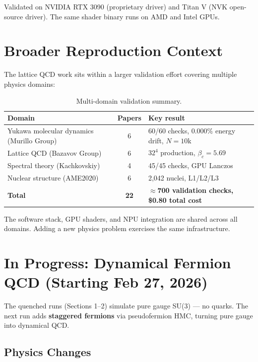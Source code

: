 \documentclass[11pt,a4paper]{article}
\newcommand{\btc}{\beta_c}
\begin{document}
Validated on NVIDIA RTX 3090 (proprietary driver) and Titan V (NVK open-source
driver).  The same shader binary runs on AMD and Intel GPUs.

\FloatBarrier
\section{Broader Reproduction Context}

The lattice QCD work sits within a larger validation effort covering multiple
physics domains:

\begin{table}[H]
\centering
\caption{Multi-domain validation summary.}
\label{tab:domains}
\renewcommand{\arraystretch}{1.25}
\begin{tabular}{lcl}
\toprule
Domain & Papers & Key result \\
\midrule
Yukawa molecular dynamics (Murillo Group) & 6 & 60/60 checks, 0.000\% energy drift, $N{=}10$k \\
Lattice QCD (Bazavov Group)               & 6 & $32^4$ production, $\btc = 5.69$ \\
Spectral theory (Kachkovskiy)             & 4 & 45/45 checks, GPU Lanczos \\
Nuclear structure (AME2020)               & 6 & 2,042 nuclei, L1/L2/L3 \\
\textbf{Total}                            & \textbf{22} & \textbf{$\approx$700 validation checks, \$0.80 total cost} \\
\bottomrule
\end{tabular}
\end{table}

The software stack, GPU shaders, and NPU integration are shared across all
domains.  Adding a new physics problem exercises the same infrastructure.

\FloatBarrier
\section{In Progress: Dynamical Fermion QCD (Starting Feb 27, 2026)}

The quenched runs (Sections 1--2) simulate pure gauge SU(3) --- no quarks.
The next run adds \textbf{staggered fermions} via pseudofermion HMC, turning
pure gauge into dynamical QCD.

\subsection{Physics Changes}
\end{document}
